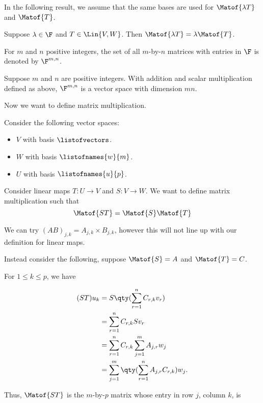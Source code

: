 In the following result, we assume that the same bases are used
for $\Matof{\lambda T}$ and $\Matof{T}$.

\begin{theorem} 
   Suppose $\lambda \in \F$ and $T \in \Lin{V, W}$. Then
   $\Matof{\lambda T} = \lambda \Matof{T}$.
\end{theorem}

\begin{note} [$\F^{m,n}$]
   For $m$ and $n$ positive integers, the set of all $m$-by-$n$ matrices
   with entries in $\F$ is denoted by $\F^{m,n}$.
\end{note}

\begin{theorem} [$\dim \F^{m,n} = mn$]
   Suppose $m$ and $n$ are positive integers. With addition and scalar
   multiplication defined as above, $\F^{m, n}$ is a vector space with dimension
   $mn$.
\end{theorem}

Now we want to define matrix multiplication.

Consider the following vector spaces:
\begin{itemize}
   \item $V$ with basis $\listofvectors$.
   \item $W$ with basis $\listofnames{w}{m}$.
   \item $U$ with basis $\listofnames{u}{p}$.
\end{itemize}

Consider linear maps $T: U \to V$ and $S: V \to W$. We
want to define matrix multiplication such that
\[ \Matof{ST} = \Matof{S}\Matof{T} \]

We can try $(AB)_{j,k} = A_{j,k} \times B_{j,k}$, however
this will not line up with our definition for linear maps.

Instead consider the following, suppose $\Matof{S} = A$ and
$\Matof{T} = C$.

For $1 \leq k \leq p$, we have

\begin{align*}
   (ST)u_k &= S \qty(\sum_{r=1}^n C_{r,k}v_r) \\
   &= \sum_{r=1}^n C_{r,k}Sv_r \\
   &= \sum_{r=1}^n C_{r,k} \sum_{j=1}^m A_{j,r}w_j \\
   &= \sum_{j=1}^m \qty(\sum_{r=1}^n A_{j,r} C_{r,k}) w_j. 
\end{align*}

Thus, $\Matof{ST}$ is the $m$-by-$p$ matrix whose entry in row
$j$, column $k$, is

